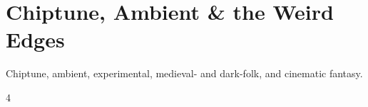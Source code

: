 \documentclass[a4paper,landscape]{memoir}
\begin{document}
\chapter{Chiptune, Ambient \& the Weird Edges}
Chiptune, ambient, experimental, medieval- and dark-folk, and cinematic fantasy.
\clearpage\begin{multicols*}{4}
\end{multicols*}

\appendix

\backmatter
\printindex[songs]
\clearpage
\printindex[tags]
\end{document}
